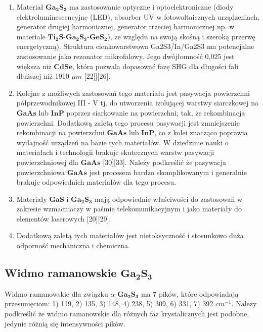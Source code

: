 \begin{enumerate}
	\item Materiał $\mathbf{Ga_{2}S_{3}}$ ma zastosowanie optyczne i optoelektroniczne (diody elektroluminescencyjne (LED), absorber UV w fotowoltaicznych urządzeniach, generator drugiej harmonicznej, generator trzeciej harmonicznej np. w materiale $\mathbf{Ti_{2}S}$-$\mathbf{Ga_{2}S_{3}}$-$\mathbf{GeS_{2}}$), ze względu na swoją skośną i szeroką przerwę energetyczną). Struktura cienkowarstwowa Ga2S3/In/Ga2S3 ma potencjalne zastosowanie jako rezonator mikrofalowy. Jego dwójłomność 0,025 jest większa niż $\mathbf{CdSe}$, która pozwala dopasować fazę SHG dla długości fali dłuższej niż 1910 $\mu m$ [22]][26].
	
	\item Kolejne z możliwych zastosowań tego materiału jest pasywacja powierzchni półprzewodnikowej III - V tj. do utworzenia izolującej warstwy siarczkowej na $\mathbf{GaAs}$ lub $\mathbf{InP}$ poprzez siarkowanie na powierzchni; tak, że rekombinacja powierzchni. Dodatkową zaletą tego procesu pasywacji jest zmniejszenie rekombinacji na powierzchni $\mathbf{GaAs}$ lub $\mathbf{InP}$, co z kolei znacząco poprawia wydajność urządzeń na bazie tych materiałów. W dziedzinie nauki o materiałach i technologii brakuje skutecznych warstw pasywacji powierzchniowej  dla $\mathbf{GaAs}$ [30][33]. Należy podkreślić że pasywacja powierzchniowa $\mathbf{GaAs}$ jest procesem bardzo skomplikowanym i generalnie brakuje odpowiednich materiałów dla tego procesu.
	
	\item Materiały $\mathbf{GaS}$ i $\mathbf{Ga_{2}S_{3}}$ mają odpowiednie właściwości do zastosowań w zakresie wzmacniaczy w paśmie telekomunikacyjnym i jako materiały do elementów laserowych [20][29].
	
	\item Dodatkową zaletą tych materiałów jest nietoksyczność i stosunkowo duża odporność mechaniczna i chemiczna.
\end{enumerate}

\subsection{Widmo ramanowskie $\mathbf{Ga_{2}S_{3}}$}

Widmo ramanowskie dla związku $\alpha$-$\mathbf{Ga_{2}S_{3}}$ ma 7 pików, które odpowiadają przesunięciom: 1) 119, 2) 135, 3) 148, 4) 238, 5) 309, 6) 331, 7) 392 $cm^{-1}$. Należy podkreślić że widmo ramanowskie dla różnych faz krystalicznych jest podobne, jedynie różnią się intensywności pików.

